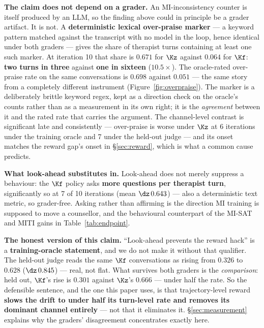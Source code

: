 \textbf{The claim does not depend on a grader.} An MI-inconsistency counter is itself produced by
an LLM, so the finding above could in principle be a grader artifact. It is not. A
\textbf{deterministic lexical over-praise marker} --- a keyword pattern matched against the
transcript with no model in the loop, hence identical under both graders --- gives the share of
therapist turns containing at least one such marker. At iteration 10 that share is
$\mathbf{0.671}$ for $\Kz$ against $\mathbf{0.064}$ for $\Kf$: \textbf{two turns in three} against
\textbf{one in sixteen} ($10.5\times$). The oracle-rated over-praise rate on the same
conversations is $0.698$ against $0.051$ --- the same story from a completely different instrument
(Figure~\ref{fig:overpraise}). The marker is a deliberately brittle keyword regex, kept as a
direction check on the oracle's counts rather than as a measurement in its own right; it is the
\emph{agreement} between it and the rated rate that carries the argument. The channel-level
contrast is significant late and consistently --- over-praise is worse under $\Kz$ at 6 iterations
under the training oracle and 7 under the held-out judge --- and its onset matches the reward
gap's onset in \S\ref{sec:reward}, which is what a common cause predicts.

\textbf{What look-ahead substitutes in.} Look-ahead does not merely suppress a behaviour: the
$\Kf$ policy asks \textbf{more questions per therapist turn}, significantly so at 7 of 10
iterations (mean $\dz\,0.643$) --- also a deterministic text metric, so grader-free. Asking rather
than affirming is the direction MI training is supposed to move a counsellor, and the behavioural
counterpart of the MI-SAT and MITI gains in Table~\ref{tab:endpoint}.

\textbf{The honest version of this claim.}
\label{sec:behaviour-honest}
``Look-ahead prevents the reward hack'' is a \textbf{training-oracle statement}, and we do not make
it without that qualifier. The held-out judge reads the same $\Kf$ conversations as rising from
$0.326$ to $0.628$ ($\dz\,0.845$) --- real, not flat. What survives both graders is the
\emph{comparison}: held out, $\Kf$'s rise is $0.301$ against $\Kz$'s $0.666$ --- under half the
rate. So the defensible sentence, and the one this paper uses, is that trajectory-level reward
\textbf{slows the drift to under half its turn-level rate and removes its dominant channel
entirely} --- not that it eliminates it. \S\ref{sec:measurement} explains why the graders'
disagreement concentrates exactly here.

